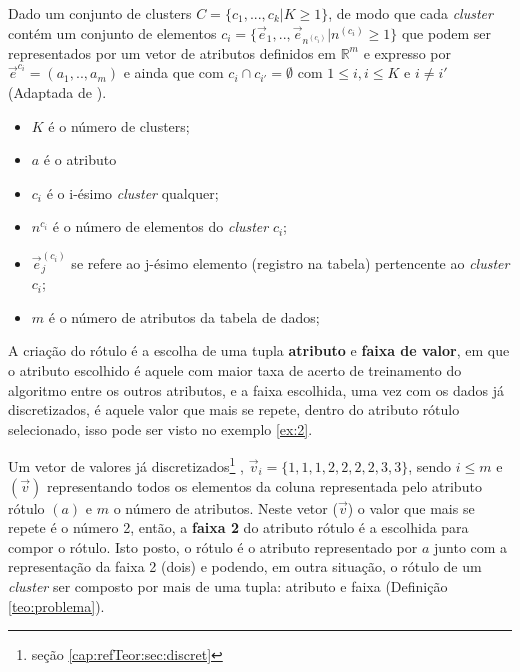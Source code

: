     \begin{teorema}
    Dado um conjunto de clusters ${C=\{c_1,...,c_k | K \geqslant 1\} }$, de modo que cada \textit{cluster} contém um conjunto de elementos ${c_i=\{\vec{e}_1,..,\vec{e}_{n^{(c_i)}}|n^{(c_i)} \geqslant 1 \}}$ que podem ser representados por um vetor de atributos definidos em ${\mathbb{R}^m }$ e expresso por ${ \vec{e}^{c_i}=(a_1,..,a_m)  }$ e ainda que  com ${ c_i \cap c_{i'}=\emptyset }$ com ${ 1 \leqslant i, i \leqslant K  }$ e ${ i \neq i' }$ (Adaptada de \cite{Lopes2016}).
        \begin{itemize}[noitemsep]
            \item ${K}$ é o número de clusters;
            \item ${a}$ é o atributo
            \item ${c_i}$ é o i-ésimo \textit{cluster} qualquer;
            \item ${n^{c_i}}$ é o número de elementos do \textit{cluster} ${c_i}$;
            \item ${\vec{e}^{(c_i)}_j}$ se refere ao j-ésimo  elemento (registro na tabela) pertencente ao \textit{cluster} ${c_i}$;
            \item ${m}$ é o número de atributos da tabela de dados;
        \end{itemize}
    \label{teo:problema}
    \end{teorema}

A criação do rótulo é a escolha de uma tupla \textbf{atributo} e \textbf{faixa de valor}, em que o atributo escolhido é aquele com maior taxa de acerto de treinamento do algoritmo entre os outros atributos, e a faixa escolhida, uma vez com os dados já discretizados, é aquele valor que mais se repete, dentro do atributo rótulo selecionado, isso pode ser visto no exemplo \ref{ex:2}.

\begin{exemplo} \label{ex:2}
Um vetor de valores já discretizados\footnote{ seção \ref{cap:refTeor:sec:discret}} , ${\vec{v}_i=\{1,1,1,2,2,2,2,3,3\}}$, sendo $i\leqslant m$ e ${(\vec{v})}$ representando todos os elementos da coluna representada pelo atributo rótulo  ${(a)}$ e $m$  o número de atributos. Neste vetor (${\vec{v}}$) o valor que mais se repete é o número 2, então, a \textbf{faixa 2} do atributo rótulo é a escolhida para compor o rótulo. Isto posto, o rótulo é o atributo representado por ${a}$ junto com a representação da faixa 2 (dois) e podendo, em outra situação, o rótulo de um \textit{cluster} ser composto por mais de uma tupla: atributo e faixa (Definição \ref{teo:problema}).
\end{exemplo}


